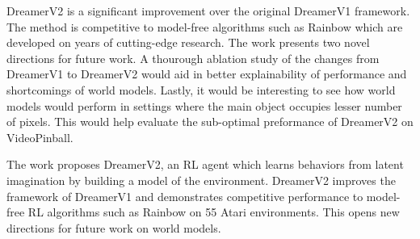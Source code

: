 \documentclass[11pt,letterpaper]{article}
\begin{document}
DreamerV2 is a significant improvement over the original DreamerV1 framework. The method is competitive to model-free algorithms such as Rainbow which are developed on years of cutting-edge research. The work presents two novel directions for future work. A thourough ablation study of the changes from DreamerV1 to DreamerV2 would aid in better explainability of performance and shortcomings of world models. Lastly, it would be interesting to see how world models would perform in settings where the main object occupies lesser number of pixels. This would help evaluate the sub-optimal preformance of DreamerV2 on VideoPinball. 

The work proposes DreamerV2, an RL agent which learns behaviors from latent imagination by building a model of the environment. DreamerV2 improves the framework of DreamerV1 and demonstrates competitive performance to model-free RL algorithms such as Rainbow on 55 Atari environments. This opens new directions for future work on world models. 
\end{document}
